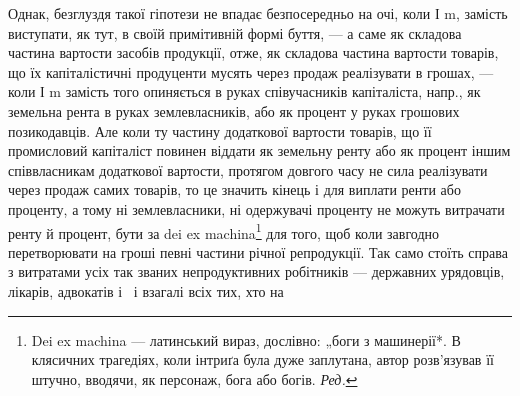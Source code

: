 Однак, безглуздя такої гіпотези не впадає безпосередньо на очі, коли І m,
замість виступати, як тут, в своїй примітивній формі буття, — а саме як
складова частина вартости засобів продукції, отже, як складова частина
вартости товарів, що їх капіталістичні продуценти мусять через продаж
реалізувати в грошах, — коли І m замість того опиняється в руках співучасників
капіталіста, напр., як земельна рента в руках землевласників,
або як процент у руках грошових позикодавців. Але коли ту частину додаткової
вартости товарів, що її промисловий капіталіст повинен віддати
як земельну ренту або як процент іншим співвласникам додаткової вартости,
протягом довгого часу не сила реалізувати через продаж самих
товарів, то це значить кінець і для виплати ренти або проценту, а тому
ні землевласники, ні одержувачі проценту не можуть витрачати ренту й
процент, бути за dei ex machina\footnote*{
Dei ex machina — латинський вираз, дослівно: „боги з машинерії*. В клясичних
трагедіях, коли інтриґа була дуже заплутана, автор розв’язував її штучно,
вводячи, як персонаж, бога або богів. \emph{Ред.}
} для того, щоб коли завгодно перетворювати
на гроші певні частини річної репродукції. Так само стоїть
справа з витратами усіх так званих непродуктивних робітників — державних
урядовців, лікарів, адвокатів і~ і взагалі всіх тих, хто на
\parbreak{}  %
